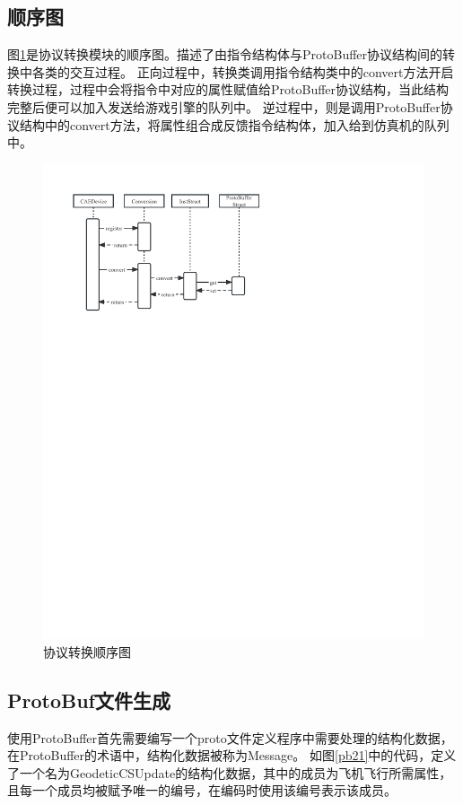 \subsection{顺序图}
图\ref{seq2}是协议转换模块的顺序图。描述了由指令结构体与ProtoBuffer协议结构间的转换中各类的交互过程。
正向过程中，转换类调用指令结构类中的convert方法开启转换过程，过程中会将指令中对应的属性赋值给ProtoBuffer协议结构，当此结构完整后便可以加入发送给游戏引擎的队列中。
逆过程中，则是调用ProtoBuffer协议结构中的convert方法，将属性组合成反馈指令结构体，加入给到仿真机的队列中。
\begin{figure}[h!]
    \begin{center}
        \includegraphics[width=\textwidth]{pictures/seq2.pdf}
        \caption{协议转换顺序图}
        \label{seq2}
    \end{center}
\end{figure}
\subsection{ProtoBuf文件生成}
使用ProtoBuffer首先需要编写一个proto文件定义程序中需要处理的结构化数据，在ProtoBuffer的术语中，结构化数据被称为Message。
如图\ref{pb21}中的代码，定义了一个名为GeodeticCSUpdate的结构化数据，其中的成员为飞机飞行所需属性，且每一个成员均被赋予唯一的编号，在编码时使用该编号表示该成员。

